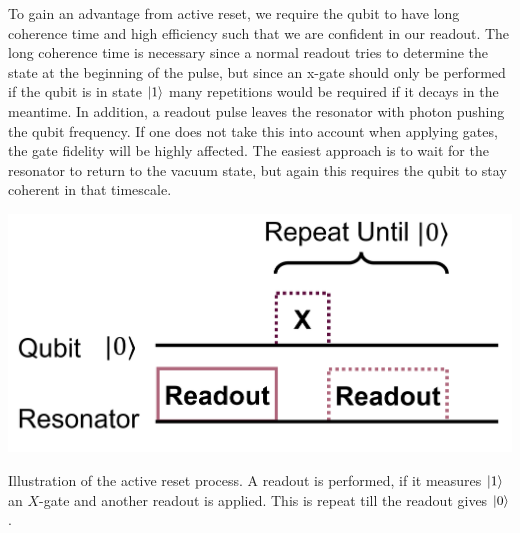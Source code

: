 To gain an advantage from active reset, we require the qubit to have long coherence time and high efficiency such that we are confident in our readout. The long coherence time is necessary since a normal readout tries to determine the state at the beginning of the pulse, but since an x-gate should only be performed if the qubit is in state $\ket{1}$ many repetitions would be required if it decays in the meantime. In addition, a readout pulse leaves the resonator with photon pushing the qubit frequency. If one does not take this into account when applying gates, the gate fidelity will be highly affected. The easiest approach is to wait for the resonator to return to the vacuum state, but again this requires the qubit to stay coherent in that timescale.  
\begin{marginfigure}[- 5 cm]
    \centering
    \includegraphics[]{Figs/circuits/active_reset.png}
    \caption{Illustration of the active reset process. A readout is performed, if it measures $\ket{1}$ an $X$-gate and another readout is applied. This is repeat till the readout gives $\ket{0}$.}
    \label{fig:active_reset}
\end{marginfigure}

